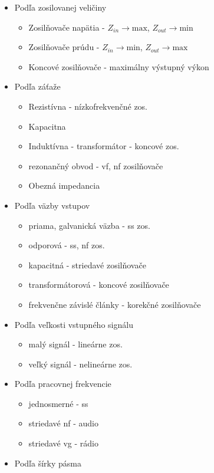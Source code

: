 \begin{itemize}
	\item Podľa zosilovanej veličiny
	\begin{itemize}
		\item Zosilňovače napätia - $Z_{in} \rightarrow \text{max}$, $Z_{out} \rightarrow \text{min}$
		\item Zosilňovače prúdu - $Z_{in} \rightarrow \text{min}$, $Z_{out} \rightarrow \text{max}$
		\item Koncové zosilňovače - maximálny výstupný výkon
	\end{itemize}
	\item Podľa záťaže
	\begin{itemize}
		\item Rezistívna - nízkofrekvenčné zos.
		\item Kapacitna
		\item Induktívna - transformátor - koncové zos.
		\item rezonančný obvod - vf, nf zosilňovače
		\item Obezná impedancia
	\end{itemize}
	\item Podľa väzby vstupov
	\begin{itemize}
		\item priama, galvanická väzba - ss zos.
		\item odporová - ss, nf zos.
		\item kapacitná - striedavé zosilňovače
		\item transformátorová - koncové zosilňovače
		\item frekvenčne závislé články - korekčné zosilňovače
	\end{itemize}
	\item Podľa veľkosti vstupného signálu
	\begin{itemize}
		\item malý signál - lineárne zos.
		\item veľký signál - nelineárne zos.
	\end{itemize}
	\item Podľa pracovnej frekvencie
	\begin{itemize}
		\item jednosmerné - ss
		\item striedavé nf - audio
		\item striedavé vg - rádio
	\end{itemize}
	\item Podľa šírky pásma
	\begin{itemize}

\end{itemize}
\end{itemize}
